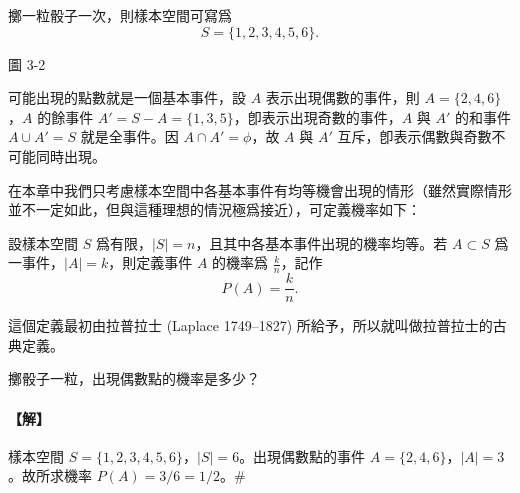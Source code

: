 \noindent
\begin{minipage}[c]{0.58\textwidth}
\begin{discussion}\label{disc:b5s-3-1}
擲一粒骰子一次，則樣本空間可寫爲
\[
S=\{1, 2, 3, 4, 5, 6\}.
\]
\end{discussion}
\end{minipage}\hfill
\begin{minipage}[c]{0.38\textwidth}
\centering
{}
\par\vspace{0.2em}
{\small 圖 3-2}
\end{minipage}

\medskip
可能出現的點數就是一個基本事件，設 $A$ 表示出現偶數的事件，則 $A=\{2, 4, 6\}$，$A$ 的餘事件 $A'=S-A=\{1, 3, 5\}$，卽表示出現奇數的事件，$A$ 與 $A'$ 的和事件 $A \cup A' = S$ 就是全事件。因 $A \cap A' = \phi$，故 $A$ 與 $A'$ 互斥，卽表示偶數與奇數不可能同時出現。

在本章中我們只考慮樣本空間中各基本事件有均等機會出現的情形（雖然實際情形並不一定如此，但與這種理想的情況極爲接近），可定義機率如下：

\medskip
\begin{definition*}
設樣本空間 $S$ 爲有限，$|S|=n$，且其中各基本事件出現的機率均等。若 $A \subset S$ 爲一事件，$|A|=k$，則定義事件 $A$ 的機率爲 $\frac{k}{n}$，記作
\[
P(A) = \frac{k}{n}.
\]
\end{definition*}
這個定義最初由拉普拉士 (Laplace 1749--1827) 所給予，所以就叫做拉普拉士的古典定義。

\medskip
\begin{example}\label{ex:b5s-3-1}
擲骰子一粒，出現偶數點的機率是多少？
\end{example}
\paragraph{【解】}
樣本空間 $S=\{1, 2, 3, 4, 5, 6\}$，$|S|=6$。出現偶數點的事件 $A=\{2, 4, 6\}$，$|A|=3$。故所求機率 $P(A) = 3/6 = 1/2$。\hfill $\#$

